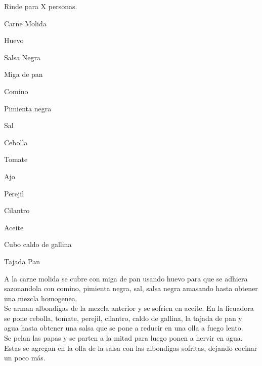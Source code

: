 
Rinde para X personas.

\begin{ingredientes}
\item Carne Molida
\item Huevo
\item Salsa Negra
\item Miga de pan
\item Comino
\item Pimienta negra
\item Sal
\item Cebolla
\item Tomate
\item Ajo
\item Perejil
\item Cilantro
\item Aceite
\item Cubo caldo de gallina
\item Tajada Pan
\end{ingredientes}
\preparacion
A la carne molida se cubre con miga de pan usando huevo para que se adhiera sazonandola con comino, pimienta negra, sal, salsa negra amasando hasta obtener una mezcla homogenea.\\

Se arman albondigas de la mezcla anterior  y se sofrien en aceite. En la licuadora se pone cebolla, tomate, perejil, cilantro, caldo de gallina, la tajada de pan y agua hasta obtener una salsa que se pone a reducir en una olla a fuego lento.\\

Se pelan las papas y se parten a la mitad para luego ponen a hervir en agua. Estas se agregan en la olla de la salsa con las albondigas sofritas, dejando cocinar un poco más.